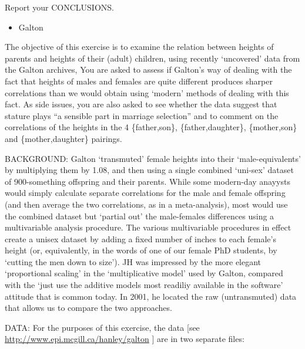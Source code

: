 \documentclass[]{book}
\providecommand{\tightlist}{%
  \setlength{\itemsep}{0pt}\setlength{\parskip}{0pt}}
\begin{document}
Report your CONCLUSIONS.

\begin{itemize}
\tightlist
\item
  Galton
\end{itemize}

The objective of this exercise is to examine the relation between heights of parents and heights of their (adult) children, using recently `uncovered' data from the Galton archives, You are asked to assess if Galton's way of dealing with the fact that heights of males and females are quite different produces sharper correlations than we would obtain using `modern' methods of dealing with this fact. As side issues, you are also asked to see whether the data suggest that stature plays ``a sensible part in marriage selection'' and to comment on the correlations of the heights in the 4 \{father,son\}, \{father,daughter\}, \{mother,son\} and \{mother,daughter\} pairings.

BACKGROUND: Galton `transmuted' female heights into their `male-equivalents' by multiplying them by 1.08, and then using a single combined `uni-sex' dataset of 900-something offspring and their parents. While some modern-day anayysts would simply calculate separate correlations for the male and female offspring (and then average the two correlations, as in a meta-analysis), most would use the combined dataset but `partial out' the male-females differences using a multivariable analysis procedure. The various multivariable procedures in effect create a unisex dataset by adding a fixed number of inches to each female's height (or, equivalently, in the words of one of our female PhD students, by `cutting the men down to size'). JH was impressed by the more elegant `proportional scaling' in the `multiplicative model' used by Galton, compared with the `just use the additive models most readiliy available in the software' attitude that is common today. In 2001, he located the raw (untransmuted) data that allows us to compare the two approaches.

DATA: For the purposes of this exercise, the data {[}see \url{http://www.epi.mcgill.ca/hanley/galton} {]} are in two separate files:
\end{document}
